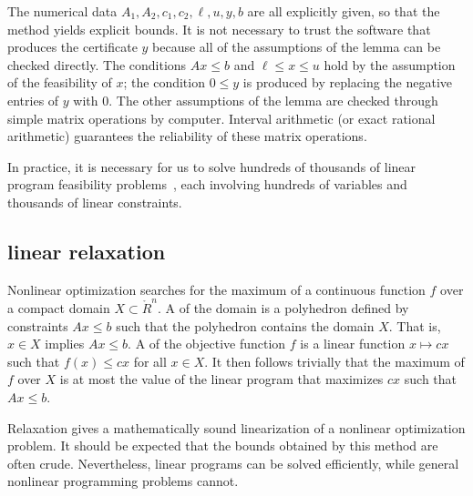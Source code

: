 The numerical data $A_1,A_2,c_1,c_2,\ell,u,y,b$ are all explicitly given,
so that the method yields explicit bounds.
It is not necessary to trust the software
that produces the certificate $y$ because
all of the assumptions of the lemma can be checked directly.
The conditions $A x \le b$ and $\ell\le x\le u$ hold by the assumption
of the feasibility of $x$; the condition $0\le y$ is produced by replacing the
negative entries of $y$ with $0$.  The other assumptions of the lemma are
checked through simple matrix operations by computer.  Interval arithmetic 
(or exact rational arithmetic) guarantees
the reliability of these matrix
operations.

In practice, it is necessary for us to solve hundreds of thousands of
linear program feasibility problems~, each involving
hundreds of variables and thousands of linear constraints.

\subsection{linear relaxation}

%
%
Nonlinear optimization searches for the maximum of a
continuous function $f$ over a compact domain $X\subset \ring{R}^n$.
A  of the domain is a polyhedron defined by
constraints $A x \le b$ such that the polyhedron contains the domain
$X$.  That is, $x\in X$ implies $A x \le b$.  A  of the objective function $f$ is a linear function
$x\mapsto c x$ such that $f(x) \le c x$ for all $x\in X$.  It then
follows trivially that the maximum of $f$ over $X$ is at most the
value of the linear program that maximizes $c x$ such that $A x \le
b$.

Relaxation gives a mathematically sound linearization of a
nonlinear optimization problem.  It should be expected that the bounds
obtained by this method are often  crude.  Nevertheless, linear
programs can be solved efficiently, while general nonlinear
programming problems cannot.


